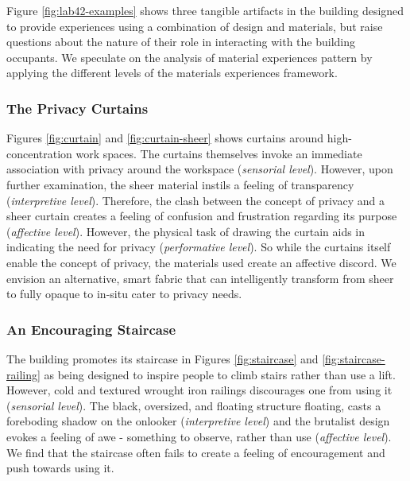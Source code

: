 \documentclass[manuscript, anonymous, review]{acmart}
\begin{document}
Figure \ref{fig:lab42-examples} shows three tangible artifacts in the building designed to provide experiences using a combination of design and materials, but raise questions about the nature of their role in interacting with the building occupants. We speculate on the analysis of material experiences pattern by applying the different levels of the materials experiences framework.

\subsubsection*{The Privacy Curtains}
Figures \ref{fig:curtain} and \ref{fig:curtain-sheer} shows curtains around high-concentration work spaces. The curtains themselves invoke an immediate association with privacy around the workspace (\textit{sensorial level}). However, upon further examination, the sheer material instils a feeling of transparency (\textit{interpretive level}). Therefore, the clash between the concept of privacy and a sheer curtain creates a feeling of confusion and frustration regarding its purpose (\textit{affective level}). However, the physical task of drawing the curtain aids in indicating the need for privacy (\textit{performative level}). So while the curtains itself enable the concept of privacy, the materials used  create an affective discord. We envision an alternative, smart fabric that can intelligently transform from sheer to fully opaque to in-situ cater to privacy needs.

\subsubsection*{An Encouraging Staircase}
The building promotes its staircase in Figures \ref{fig:staircase} and \ref{fig:staircase-railing} as being designed to inspire people to climb stairs rather than use a lift. However, cold and textured wrought iron railings discourages one from using it (\textit{sensorial level}). The black, oversized, and floating structure floating, casts a foreboding  shadow on the onlooker  (\textit{interpretive level}) and the brutalist design evokes a feeling of awe - something to observe, rather than use (\textit{affective level}). We find that the staircase often fails to create a feeling of encouragement and push towards using it.
\end{document}

